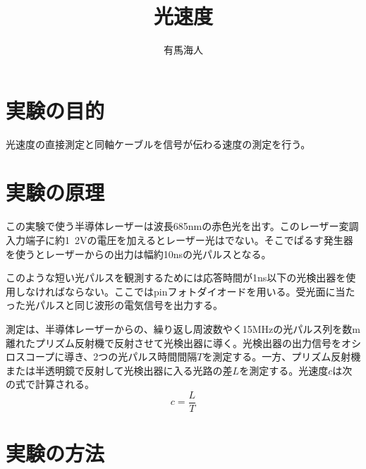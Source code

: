 \documentclass{jsarticle}
\begin{document}
\title{光速度}
\author{有馬海人}
\maketitle

\section{実験の目的}

光速度の直接測定と同軸ケーブルを信号が伝わる速度の測定を行う。

\section{実験の原理}

    この実験で使う半導体レーザーは波長685nmの赤色光を出す。このレーザー変調入力端子に約1~2Vの電圧を加えるとレーザー光はでない。そこでぱるす発生器を使うとレーザーからの出力は幅約10nsの光パルスとなる。\\
    \par このような短い光パルスを観測するためには応答時間が1ns以下の光検出器を使用しなければならない。ここではpinフォトダイオードを用いる。受光面に当たった光パルスと同じ波形の電気信号を出力する。\\
    \par 測定は、半導体レーザーからの、繰り返し周波数やく15MHzの光パルス列を数m離れたプリズム反射機で反射させて光検出器に導く。光検出器の出力信号をオシロスコープに導き、2つの光パルス時間間隔$T$を測定する。一方、プリズム反射機または半透明鏡で反射して光検出器に入る光路の差$L$を測定する。光速度$c$は次の式で計算される。
\begin{equation}
    c = \frac{L}{T}
\end{equation}

\section{実験の方法}
\end{document}
